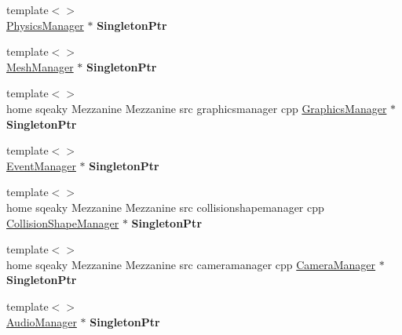\begin{DoxyCompactItemize}
\item 
\hypertarget{classMezzanine_1_1Singleton_ac923e5b8546f94e614608c60b3187a77}{
{\footnotesize template$<$$>$ }\\\hyperlink{classMezzanine_1_1PhysicsManager}{PhysicsManager} $\ast$ {\bfseries SingletonPtr}}
\label{classMezzanine_1_1Singleton_ac923e5b8546f94e614608c60b3187a77}

\item 
\hypertarget{classMezzanine_1_1Singleton_aa773394d88e689a49d72de8bbd87c12d}{
{\footnotesize template$<$$>$ }\\\hyperlink{classMezzanine_1_1MeshManager}{MeshManager} $\ast$ {\bfseries SingletonPtr}}
\label{classMezzanine_1_1Singleton_aa773394d88e689a49d72de8bbd87c12d}

\item 
\hypertarget{classMezzanine_1_1Singleton_a4580e1b2a1a523fab2aaab3e07bb7fde}{
{\footnotesize template$<$$>$ }\\home sqeaky Mezzanine Mezzanine src graphicsmanager cpp \hyperlink{classMezzanine_1_1GraphicsManager}{GraphicsManager} $\ast$ {\bfseries SingletonPtr}}
\label{classMezzanine_1_1Singleton_a4580e1b2a1a523fab2aaab3e07bb7fde}

\item 
\hypertarget{classMezzanine_1_1Singleton_a8376157cc0e67cf8448bc1724e5c2ade}{
{\footnotesize template$<$$>$ }\\\hyperlink{classMezzanine_1_1EventManager}{EventManager} $\ast$ {\bfseries SingletonPtr}}
\label{classMezzanine_1_1Singleton_a8376157cc0e67cf8448bc1724e5c2ade}

\item 
\hypertarget{classMezzanine_1_1Singleton_a1a34efe9afcd59d53e6bd0f1092664b1}{
{\footnotesize template$<$$>$ }\\home sqeaky Mezzanine Mezzanine src collisionshapemanager cpp \hyperlink{classMezzanine_1_1CollisionShapeManager}{CollisionShapeManager} $\ast$ {\bfseries SingletonPtr}}
\label{classMezzanine_1_1Singleton_a1a34efe9afcd59d53e6bd0f1092664b1}

\item 
\hypertarget{classMezzanine_1_1Singleton_a95c4ea681b5921599ffd1a29f5b155e6}{
{\footnotesize template$<$$>$ }\\home sqeaky Mezzanine Mezzanine src cameramanager cpp \hyperlink{classMezzanine_1_1CameraManager}{CameraManager} $\ast$ {\bfseries SingletonPtr}}
\label{classMezzanine_1_1Singleton_a95c4ea681b5921599ffd1a29f5b155e6}

\item 
\hypertarget{classMezzanine_1_1Singleton_a2280f1ce7ec5bc5afa7c4ab5fbf37c66}{
{\footnotesize template$<$$>$ }\\\hyperlink{classMezzanine_1_1AudioManager}{AudioManager} $\ast$ {\bfseries SingletonPtr}}
\label{classMezzanine_1_1Singleton_a2280f1ce7ec5bc5afa7c4ab5fbf37c66}

\end{DoxyCompactItemize}
